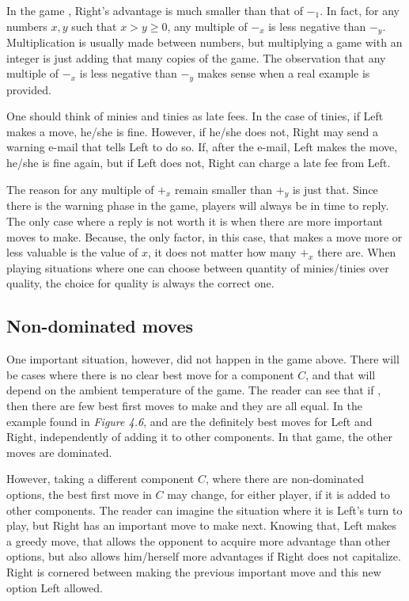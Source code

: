 In the game , Right's advantage is much smaller than that of $-_1$. In fact, for any numbers $x, y$ such that $x > y \ge 0$, any multiple of $-_x$ is less negative than $-_y$. Multiplication is usually made between numbers, but multiplying a game with an integer is just adding that many copies of the game. The observation that any multiple of $-_x$ is less negative than $-_y$ makes sense when a real example is provided.

One should think of minies and tinies as late fees. In the case of tinies, if Left makes a move, he/she is fine. However, if he/she does not, Right may send a warning e-mail that tells Left to do so. If, after the e-mail, Left makes the move, he/she is fine again, but if Left does not, Right can charge a late fee from Left.

The reason for any multiple of $+_x$ remain smaller than $+_y$ is just that. Since there is the warning phase in the game, players will always be in time to reply. The only case where a reply is not worth it is when there are more important moves to make. Because, the only factor, in this case, that makes a move more or less valuable is the value of $x$, it does not matter how many $+_x$ there are. When playing situations where one can choose between quantity of minies/tinies over quality, the choice for quality is always the correct one.

\subsection*{Non-dominated moves}

One important situation, however, did not happen in the game above. There will be cases where there is no clear best move for a component $C$, and that will depend on the ambient temperature of the game. The reader can see that if , then there are few best first moves to make and they are all equal. In the example found in \textit{Figure 4.6},  and  are the definitely best moves for Left and Right, independently of adding it to other components. In that game, the other moves are dominated.

However, taking a different component $C$, where there are non-dominated options, the best first move in $C$ may change, for either player, if it is added to other components. The reader can imagine the situation where it is Left's turn to play, but Right has an important move to make next. Knowing that, Left makes a greedy move, that allows the opponent to acquire more advantage than other options, but also allows him/herself more advantages if Right does not capitalize. Right is cornered between making the previous important move and this new option Left allowed.

